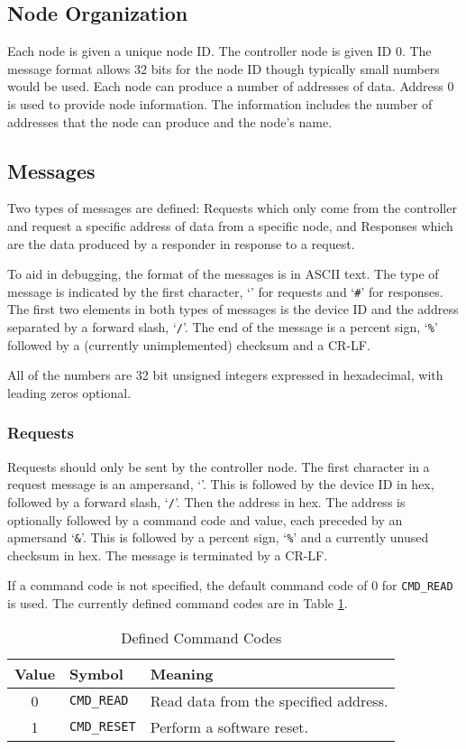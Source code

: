 \documentclass[10pt, openany, draft]{article}
\begin{document}
\subsection{Node Organization}
Each node is given a unique node ID.  The controller node is given ID 0.  The message format allows 32 bits for the node ID though typically small numbers would be used.  Each node can produce a number of addresses of data.  Address 0 is used to provide node information.  The information includes the number of addresses that the node can produce and the node's name.

\subsection{Messages}
Two types of messages are defined: Requests which only come from the controller and request a specific address of data from a specific node, and Responses which are the data produced by a responder in response to a request.

To aid in debugging, the format of the messages is in ASCII text.  The type of message is indicated by the first character, `\texttt{\@}' for requests and `\texttt{\#}' for responses.  The first two elements in both types of messages is the device ID and the address separated by a forward slash, `\texttt{/}'.  The end of the message is a percent sign, `\texttt{\%}' followed by a (currently unimplemented) checksum and a CR-LF.

All of the numbers are 32 bit unsigned integers expressed in hexadecimal, with leading zeros optional.  

\subsubsection{Requests}
Requests should only be sent by the controller node.  The first character in a request message is an ampersand, `\texttt{\@}'.  This is followed by the device ID in hex, followed by a forward slash, `\texttt{/}'.  Then the address in hex.  The address is optionally followed by a command code and value, each preceded by an apmersand `\texttt{\&}'.  This is followed by a percent sign, `\texttt{\%}' and a currently unused checksum in hex.  The message is terminated by a CR-LF.

If a command code is not specified, the default command code of 0 for \texttt{CMD\_READ} is used.  The currently defined command codes are in Table \ref{tab:commands}.

\begin{table}
  \centering
  \begin{tabular}{c l l}
    \hline
    Value & Symbol & Meaning \\
    \hline
    0 & \texttt{CMD\_READ} & Read data from the specified address.\\
    1 & \texttt{CMD\_RESET} & Perform a software reset.\\
  \end{tabular}
  \caption{Defined Command Codes}
  \label{tab:commands}
\end{table}
\end{document}

